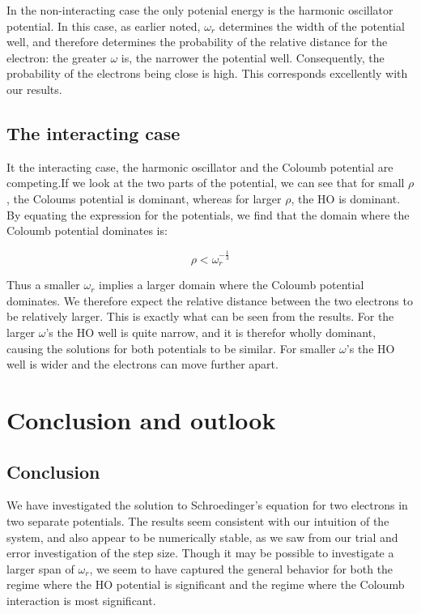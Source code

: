 \documentclass[a4paper, 10pt]{article}
\begin{document}
In the non-interacting case the only potenial energy is the harmonic oscillator potential. In this case, as earlier noted, $\omega_r$ determines the width of the potential well, and therefore determines the probability of the relative distance for the electron: the greater $\omega$ is, the narrower the potential well. Consequently, the probability of the electrons being close is high. This corresponds excellently with our results.

\subsection{The interacting case}

It the interacting case, the harmonic oscillator and the Coloumb potential are competing.If we look at the two parts of the potential, we can see that for small $\rho$, the Coloums potential is dominant, whereas for larger $\rho$, the HO is dominant. By equating the expression for the potentials, we find that the domain where the Coloumb potential dominates is:

$$
\rho < \omega_r^{-\frac{1}{3}}
$$ 

Thus a smaller $\omega_r$ implies a larger domain where the Coloumb potential dominates. We therefore expect the relative distance between the two electrons to be relatively larger. This is exactly what can be seen from the results. For the larger $\omega$'s the HO well is quite narrow, and it is therefor wholly dominant, causing the solutions for both potentials to be similar. For smaller $\omega$'s the HO well is wider and the electrons can move further apart.
\section{Conclusion and outlook}
\subsection{Conclusion}
We have investigated the solution to Schroedinger's equation for two electrons in two separate potentials. The results seem consistent with our intuition of the system, and also appear to be numerically stable, as we saw from our trial and error investigation of the step size. Though it may be possible to investigate a larger span of $\omega_r$, we seem to have captured the general behavior for both the regime where the HO potential is significant and the regime where the Coloumb interaction is most significant.\\
\linebreak
\end{document}
